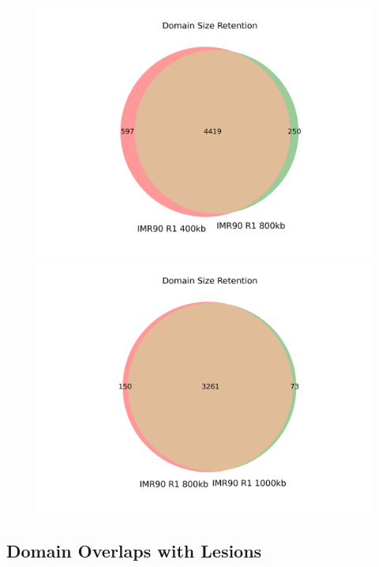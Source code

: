 \begin{figure}[H]
  \begin{minipage}{0.45\textwidth}%
    \includegraphics[width=\textwidth]{./figures/supplementary/domains/venn2-IMR90-R1-400-vs-IMR90-R1-800.png}
  \end{minipage}%
  \hfill
  \begin{minipage}{0.45\textwidth}
    \centering
    \includegraphics[width=\textwidth]{./figures/supplementary/domains/venn2-IMR90-R1-800-vs-IMR90-R1-1000.png}
  \end{minipage}
\end{figure}
\newpage

\subsection*{Domain Overlaps with Lesions}

